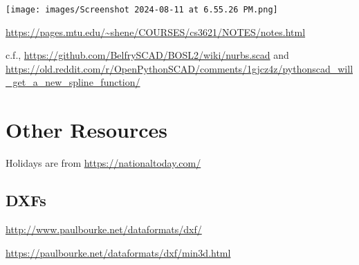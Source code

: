 \documentclass{ltxdoc}
\begin{document}
\noindent\texttt{[image: images/Screenshot 2024-08-11 at 6.55.26 PM.png]}

\url{https://pages.mtu.edu/~shene/COURSES/cs3621/NOTES/notes.html}

c.f., \url{https://github.com/BelfrySCAD/BOSL2/wiki/nurbs.scad} and \url{https://old.reddit.com/r/OpenPythonSCAD/comments/1gjcz4z/pythonscad_will_get_a_new_spline_function/}

\section{Other Resources}
 
Holidays are from \url{https://nationaltoday.com/}

\subsection{DXFs}

\url{http://www.paulbourke.net/dataformats/dxf/}

\noindent\url{https://paulbourke.net/dataformats/dxf/min3d.html}


 


\end{document}
